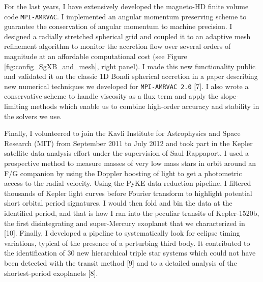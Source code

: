 \documentclass[letterpaper,12pt,onecolumn]{article}
\begin{document}
\normalsize

For the last years, I have extensively developed the magneto-HD finite volume code \texttt{MPI-AMRVAC}. I implemented an angular momentum preserving scheme to guarantee the conservation of angular momentum to machine precision. I designed a radially stretched spherical grid and coupled it to an adaptive mesh refinement algorithm to monitor the accretion flow over several orders of magnitude at an affordable computational cost (see Figure\,\ref{fig:config_SgXB_and_mesh}, right panel). I made this new functionality public and validated it on the classic 1D Bondi spherical accretion in a paper describing new numerical techniques we developed for \texttt{MPI-AMRVAC 2.0} [7]. I also wrote a conservative scheme to handle viscosity as a flux term and apply the slope-limiting methods which enable us to combine high-order accuracy and stability in the solvers we use.

Finally, I volunteered to join the Kavli Institute for Astrophysics and Space Research (MIT) from September 2011 to July 2012 and took part in the Kepler satellite data analysis effort under the supervision of Saul Rappaport. I used a prospective method to measure masses of very low mass stars in orbit around an F/G companion by using the Doppler boosting of light to get a photometric access to the radial velocity. Using the PyKE data reduction pipeline, I filtered thousands of Kepler light curves before Fourier transform to highlight potential short orbital period signatures. I would then fold and bin the data at the identified period, and that is how I ran into the peculiar transits of Kepler-1520b, the first disintegrating and super-Mercury exoplanet that we characterized in [10]. Finally, I developed a pipeline to systematically look for eclipse timing variations, typical of the presence of a perturbing third body. It contributed to the identification of 30 new hierarchical triple star systems which could not have been detected with the transit method [9] and to a detailed analysis of the shortest-period exoplanets [8].
\end{document}
